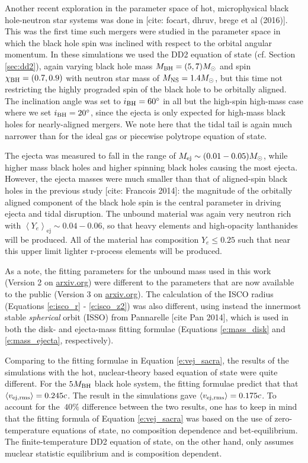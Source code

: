 Another recent exploration in the parameter space of hot, microphysical black hole-neutron star systems was done in [cite: focart, dhruv, brege et al (2016)].
This was the first time such mergers were studied in the parameter space in which the black hole spin was inclined with respect to the orbital angular momentum. 
In these simulations we used the DD2 equation of state (cf. Section \ref{sec:dd2}), again varying black hole mass $M_{\rm BH} = (5, 7) M_\odot$ and spin $\chi_{\rm BH} = (0.7, 0.9)$ with neutron star mass of $M_{\rm NS} = 1.4 M_\odot$, but this time not restricting the highly prograded spin of the black hole to be orbitally aligned.  The inclination angle was set to $i_{\rm BH}=60^{\circ}$ in all but the high-spin high-mass case where we set $i_{\rm BH}=20^{\circ}$, since the ejecta is only expected for high-mass black holes for nearly-aligned mergers.  We note here that the tidal tail is again much narrower than for the ideal gas or piecewise polytrope equation of state.  

The ejecta was measured to fall in the range of $M_{\rm ej} \sim (0.01 - 0.05) M_\odot$, while higher mass black holes and higher spinning black holes causing the most ejecta.  
However, the ejecta masses were much smaller than that of aligned-spin black holes in the previous study [cite: Francois 2014]: the magnitude of the orbitally aligned component of the black hole spin is the central parameter in driving ejecta and tidal disruption.  
The unbound material was again very neutron rich with $\left\langle Y_e \right\rangle_\textrm{ej} \sim 0.04 - 0.06$, so that heavy elements and high-opacity lanthanides will be produced.
All of the material has composition $Y_e \le 0.25$ such that near this upper limit lighter r-process elements will be produced.

As a note, the fitting parameters for the unbound mass used in this work (Version 2 on \url{arxiv.org}) were different to the parameters that are now available to the public (Version 3 on \url{arxiv.org}).
The calculation of the ISCO radius (Equations \ref{e:isco_r} - \ref{e:isco_z2}) was also different, using instead the innermost stable \textit{spherical} orbit (ISSO) from Pannarelle [cite Pan 2014], which is used in both the disk- and ejecta-mass fitting formulae (Equations \ref{e:mass_disk} and \ref{e:mass_ejecta}, respectively).

Comparing to the fitting formulae in Equation \ref{e:vej_sacra}, the results of the simulations with the hot, nuclear-theory based equation of state were quite different.  
For the $5 M_{\rm BH}$ black hole system, the fitting formulae predict that that 
$\left\langle v_{\rm ej, rms} \right\rangle = 0.245 c$.  The result in the \SpEC simulations gave $\left\langle v_{\rm ej, rms} \right\rangle = 0.175 c$.  To account for the $~40 \%$ difference between the two results, one has to keep in mind that the fitting formula of  Equation \ref{e:vej_sacra} was based on the use of zero-temperature equations of state, no composition dependence and bet-equilibrium.  The finite-temperature DD2 equation of state, on the other hand, only assumes muclear statistic equilibrium and is composition dependent.  

